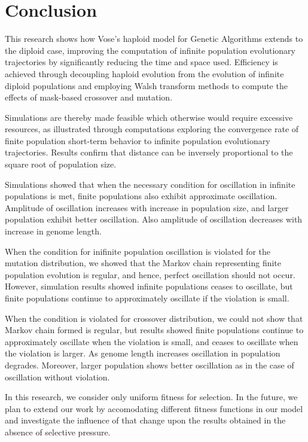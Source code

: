 \chapter{Conclusion}
This research shows how Vose's haploid model for Genetic Algorithms
extends to the diploid case, improving the computation of infinite
population evolutionary trajectories by significantly reducing the
time and space used.  Efficiency is achieved through decoupling
haploid evolution from the evolution of infinite diploid populations
and employing Walsh transform methods to compute the effects of
mask-based crossover and mutation.  

Simulations are thereby made feasible which otherwise would require
excessive resources, as illustrated through computations exploring 
the convergence rate of finite population short-term behavior to infinite population evolutionary trajectories. 
Results confirm that distance can be inversely proportional to the square root of population size.

Simulations showed that when the necessary condition for oscillation in infinite populations is met, 
finite populations also exhibit approximate oscillation. Amplitude of oscillation increases with 
increase in population size, and larger population exhibit better oscillation. Also amplitude of 
oscillation decreases with increase in genome length.

When the condition for inifinite population oscillation is violated for the mutation distribution, 
we showed that the Markov chain representing finite population evolution is regular, and hence, 
perfect oscillation should not occur. However, simulation results showed 
infinite populations ceases to oscillate, 
but finite populations continue to approximately oscillate if the violation is small. 

When the condition is violated for crossover distribution,
we could not show that Markov chain formed is regular, 
but results showed finite populations continue to approximately oscillate 
when the violation is small, and ceases to oscillate when the violation is larger. 
As genome length increases oscillation in population degrades. 
Moreover, larger population shows better oscillation 
as in the case of oscillation without violation.

In this research, we consider only uniform fitness for selection.  
In the future, we plan to extend our work by accomodating different fitness functions in our model and investigate 
the influence of that change upon the results obtained in the absence of selective pressure.



